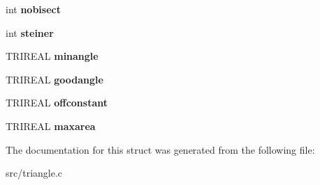 \begin{DoxyCompactItemize}
\item 
\hypertarget{structbehavior_aaec9c0c9597647bacbea9980ab7b6332}{
int {\bfseries nobisect}}
\label{structbehavior_aaec9c0c9597647bacbea9980ab7b6332}

\item 
\hypertarget{structbehavior_a16a49e9ff6eefec8e56016b13d8134b0}{
int {\bfseries steiner}}
\label{structbehavior_a16a49e9ff6eefec8e56016b13d8134b0}

\item 
\hypertarget{structbehavior_af275179feaa615d27c8ef17a55c426b3}{
TRIREAL {\bfseries minangle}}
\label{structbehavior_af275179feaa615d27c8ef17a55c426b3}

\item 
\hypertarget{structbehavior_a61c5ba5e5b13c93afbfbba944f4df6fc}{
TRIREAL {\bfseries goodangle}}
\label{structbehavior_a61c5ba5e5b13c93afbfbba944f4df6fc}

\item 
\hypertarget{structbehavior_a5a2620527f3b0c9e31152eb53c605e0b}{
TRIREAL {\bfseries offconstant}}
\label{structbehavior_a5a2620527f3b0c9e31152eb53c605e0b}

\item 
\hypertarget{structbehavior_aab838d0b35d28471d7b599e8bae44c4a}{
TRIREAL {\bfseries maxarea}}
\label{structbehavior_aab838d0b35d28471d7b599e8bae44c4a}

\end{DoxyCompactItemize}


The documentation for this struct was generated from the following file:\begin{DoxyCompactItemize}
\item 
src/triangle.c\end{DoxyCompactItemize}
